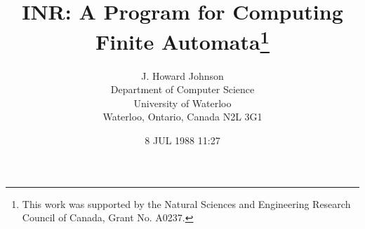 \title{INR: A Program for Computing\\Finite Automata\thanks{This work was
	supported by the Natural Sciences and Engineering Research Council
	of Canada, Grant No. A0237.}}
\author{J. Howard Johnson\\
	Department of Computer Science\\
	University of Waterloo\\
	Waterloo, Ontario, Canada N2L 3G1}
\date{8 JUL 1988 11:27}
\newcommand{\lhead}{J. Howard Johnson}
\newcommand{\rhead}{INR: A Program for Computing Finite Automata}












